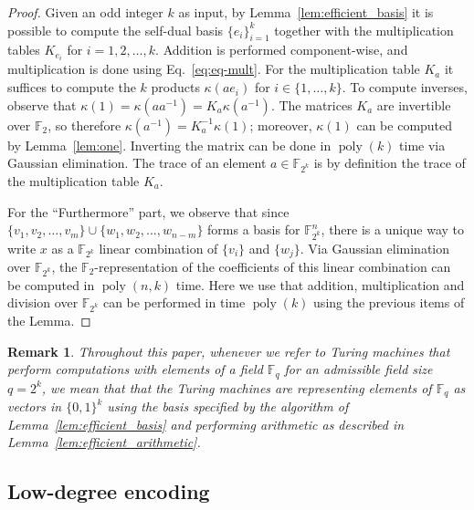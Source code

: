 \documentclass[11pt]{article}
\newtheorem{remark}[theorem]{Remark}
\theoremstyle{definition}
\newcommand{\F}{\ensuremath{\mathbb{F}}}
\newcommand{\downsize}{\kappa}
\DeclareMathOperator{\poly}{poly}
\begin{document}
\begin{proof}
  Given an odd integer $k$ as input, by Lemma~\ref{lem:efficient_basis} it is
  possible to compute the self-dual basis $\{e_i\}_{i=1}^k$ together with the
  multiplication tables $K_{e_i}$ for $i = 1, 2, \ldots, k$.
  Addition is performed component-wise, and multiplication is done
  using Eq.~\eqref{eq:eq-mult}.
  For the multiplication table $K_a$ it suffices to compute the $k$ products
  $\downsize(a e_i)$ for $i\in\{1,\ldots,k\}$.
  To compute inverses, observe that $\downsize(1) = \downsize(aa^{-1}) = K_a
  \downsize(a^{-1})$.
  The matrices $K_a$ are invertible over $\F_2$, so therefore $\downsize(a^{-1}) =
  K_a^{-1} \downsize(1)$; moreover, $\kappa(1)$ can be computed by Lemma~\ref{lem:one}.
  Inverting the matrix can be done in $\poly(k)$ time via Gaussian elimination.
  The trace of an element $a \in \F_{2^k}$ is by definition the trace of the
  multiplication table $K_a$.

  For the ``Furthermore'' part, we observe that since $\{v_1, v_2, \ldots, v_m
  \} \cup \{w_1, w_2, \ldots, w_{n-m} \}$ forms a basis for $\F_{2^k}^n$, there
  is a unique way to write $x$ as a $\F_{2^k}$ linear combination of $\{ v_i\}$
  and $\{w_j\}$.
  Via Gaussian elimination over $\F_{2^k}$, the $\F_2$-representation of the
  coefficients of this linear combination can be computed in $\poly(n,k)$ time.
  Here we use that addition, multiplication and division over $\F_{2^k}$ can be
  performed in time $\poly(k)$ using the previous items of the Lemma.
\end{proof}

\begin{remark}
  \label{rmk:tm_fields}
  Throughout this paper, whenever we refer to Turing machines that perform
  computations with elements of a field $\F_q$ for an admissible field size $q =
  2^k$, we mean that that the Turing machines are representing elements of
  $\F_q$ as vectors in $\{0,1\}^{k}$ using the basis specified by the
  algorithm of Lemma~\ref{lem:efficient_basis} and performing arithmetic as
  described in Lemma~\ref{lem:efficient_arithmetic}.
\end{remark}

\subsection{Low-degree encoding}
\label{sec:ld-encoding}
\end{document}
